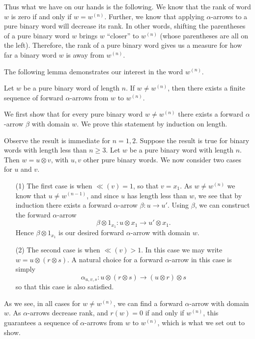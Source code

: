 Thus what we have on our hands is the following. We know that the rank of word $w$
is zero if and only if $w = w^{(n)}$. Further, we know that applying $\alpha$-arrows
to a pure binary word will decrease its rank. In other words, shifting the parentheses of a pure binary 
word $w$ brings $w$ ``closer'' to $w^{(n)}$ (whose parentheses are all on the left). 
Therefore, the rank of a pure binary word gives us a measure for how far 
a binary word $w$ is away from $w^{(n)}$. 

The following lemma demonstrates our interest in the word $w^{(n)}$.


\begin{proposition}\label{proposition_existence_of_w_to_wn}
    Let $w$ be a pure binary word of length $n$. If $w \ne w^{(n)}$, 
    then there exists a finite sequence of forward
    $\alpha$-arrows from $w$ to $w^{(n)}$. 
\end{proposition}

\begin{prf}
    We first show that for every pure binary 
    word $w \ne w^{(n)}$ there exists a forward $\alpha$-arrow 
    $\beta$ with domain $w$.
    We prove this statement by induction on length.

    Observe the result is immediate for $n = 1, 2$.
    Suppose the result is true for 
    binary words with length less than $n \ge 3$. 
    Let $w$ be a pure binary word with length $n$. 
    Then $w = u \otimes v$, with $u,v$ other pure binary words. 
    We now consider two cases for $u$ and $v$.
    \begin{itemize}
        \item[(1)] The first case is when  $\ll(v) = 1$, so that $v = x_1$. 
        As $w \ne w^{(n)}$ we know that $u \ne w^{(n-1)}$,
        and since $u$ has 
        length less than $w$, we see that by induction there exists a forward $\alpha$-arrow 
        $\beta: u \to u'$. Using $\beta$, we can construct the 
        forward $\alpha$-arrow 
        \[
            \beta \otimes 1_{x_1}: u \otimes x_1 \to u' \otimes x_1.  
        \]
        Hence $\beta \otimes 1_{x_1}$ is our desired forward $\alpha$-arrow with domain $w$.

        \item[(2)] The second case is when $\ll(v) > 1$. In this case we may write 
        $w = u \otimes (r \otimes s)$. A natural choice for a forward 
        $\alpha$-arrow in this case is simply 
        \[
           \alpha_{u,v,s}:  u \otimes (r \otimes s) \to (u \otimes r) \otimes s
        \]
        so that this case is also satisfied. 
    \end{itemize}
    As we see, in all cases for $w \ne w^{(n)}$, we can find a forward $\alpha$-arrow 
    with domain $w$. As $\alpha$-arrows decrease rank, and $r(w) = 0$ if and only if $w^{(n)}$,
    this guarantees a sequence of $\alpha$-arrows from $w$ to $w^{(n)}$, which is what 
    we set out to show.
\end{prf}

